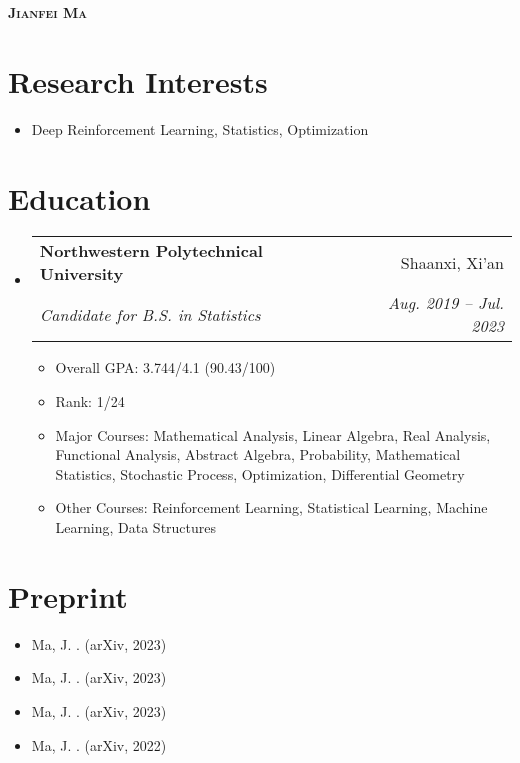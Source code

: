 \documentclass[letterpaper,11pt]{article}
\makeatletter
\newcommand{\resumeItem}[1]{
  \item\small{
    {#1 \vspace{-2pt}}
  }
}
\newcommand{\resumeSubheading}[4]{
  \vspace{-2pt}\item
    \begin{tabular*}{0.97\textwidth}[t]{l@{\extracolsep{\fill}}r}
      \textbf{#1} & #2 \\
      \textit{\small#3} & \textit{\small #4} \\
    \end{tabular*}\vspace{-7pt}
}
\newcommand{\resumeSubHeadingListStart}{\begin{itemize}[leftmargin=0.15in, label={}]}
\newcommand{\resumeSubHeadingListEnd}{\end{itemize}}
\newcommand{\resumeItemListStart}{\begin{itemize}}
\newcommand{\resumeItemListEnd}{\end{itemize}\vspace{-5pt}}
\makeatother
\begin{document}

\begin{center}
    \textbf{\Huge \scshape Jianfei Ma} \\ \vspace{1pt}
    \small{\item{
     {\href{mailto:matrixfeeney@gmail.com}{}}
    {\href{https://github.com/MagiFeeney}{}}     
     {\href{https://magifeeney.github.io}{}}       
    }}
\end{center}

\section{Research Interests}
  \resumeSubHeadingListStart
    \resumeItem
      {Deep Reinforcement Learning, Statistics, Optimization}%
  \resumeSubHeadingListEnd

\section{Education}
  \resumeSubHeadingListStart
    \resumeSubheading
      {Northwestern Polytechnical University}{Shaanxi, Xi'an}
      {Candidate for B.S. in Statistics}{Aug. 2019 -- Jul. 2023}
    \resumeItemListStart
      \resumeItem
      {Overall GPA: 3.744/4.1 (90.43/100)}
     \resumeItem
      {Rank: 1/24}
     \resumeItem
      {Major Courses: Mathematical Analysis, Linear Algebra, Real Analysis, Functional Analysis, Abstract Algebra, Probability, Mathematical Statistics, Stochastic Process, Optimization, Differential Geometry}
      \resumeItem
      {Other Courses: Reinforcement Learning, Statistical Learning, Machine Learning, Data Structures}
    \resumeItemListEnd
  \resumeSubHeadingListEnd

\section{Preprint}
      \resumeItemListStart
        \resumeItem{Ma, J. \href{https://arxiv.org/abs/2310.08100}{\color{darkblue}{Generative Intrinsic Optimization: Intrisic Control with Model Learning}}. (arXiv, 2023)}
        \resumeItem{Ma, J. \href{https://arxiv.org/abs/2310.08091}{\color{darkblue}{Discerning Temporal Difference Learning}}. (arXiv, 2023)}
        \resumeItem{Ma, J. \href{https://arxiv.org/abs/2302.00533}{\color{darkblue}{Distillation Policy Optimization}}. (arXiv, 2023)}
        \resumeItem{Ma, J. \href{https://arxiv.org/abs/2208.09322v2}{\color{darkblue}{Entropy Augmented Reinforcement Learning}}. (arXiv, 2022)}
      \resumeItemListEnd
      
\end{document}
